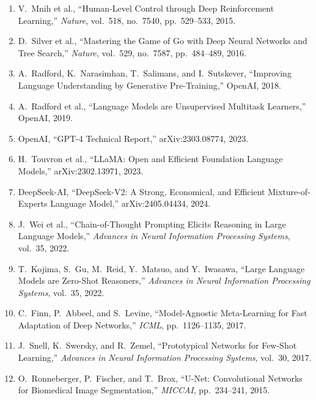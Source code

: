 \documentclass[11pt]{article}
\begin{document}
\begin{enumerate}
\item V.\ Mnih et al., ``Human-Level Control through Deep Reinforcement Learning,'' \textit{Nature}, vol.\ 518, no.\ 7540, pp.\ 529--533, 2015.

\item D.\ Silver et al., ``Mastering the Game of Go with Deep Neural Networks and Tree Search,'' \textit{Nature}, vol.\ 529, no.\ 7587, pp.\ 484--489, 2016.

\item A.\ Radford, K.\ Narasimhan, T.\ Salimans, and I.\ Sutskever, ``Improving Language Understanding by Generative Pre-Training,'' OpenAI, 2018.

\item A.\ Radford et al., ``Language Models are Unsupervised Multitask Learners,'' OpenAI, 2019.

\item OpenAI, ``GPT-4 Technical Report,'' arXiv:2303.08774, 2023.

\item H.\ Touvron et al., ``LLaMA: Open and Efficient Foundation Language Models,'' arXiv:2302.13971, 2023.

\item DeepSeek-AI, ``DeepSeek-V2: A Strong, Economical, and Efficient Mixture-of-Experts Language Model,'' arXiv:2405.04434, 2024.

\item J.\ Wei et al., ``Chain-of-Thought Prompting Elicits Reasoning in Large Language Models,'' \textit{Advances in Neural Information Processing Systems}, vol.\ 35, 2022.

\item T.\ Kojima, S.\ Gu, M.\ Reid, Y.\ Matsuo, and Y.\ Iwasawa, ``Large Language Models are Zero-Shot Reasoners,'' \textit{Advances in Neural Information Processing Systems}, vol.\ 35, 2022.

\item C.\ Finn, P.\ Abbeel, and S.\ Levine, ``Model-Agnostic Meta-Learning for Fast Adaptation of Deep Networks,'' \textit{ICML}, pp.\ 1126--1135, 2017.

\item J.\ Snell, K.\ Swersky, and R.\ Zemel, ``Prototypical Networks for Few-Shot Learning,'' \textit{Advances in Neural Information Processing Systems}, vol.\ 30, 2017.

\item O.\ Ronneberger, P.\ Fischer, and T.\ Brox, ``U-Net: Convolutional Networks for Biomedical Image Segmentation,'' \textit{MICCAI}, pp.\ 234--241, 2015.


\end{enumerate}
\end{document}

